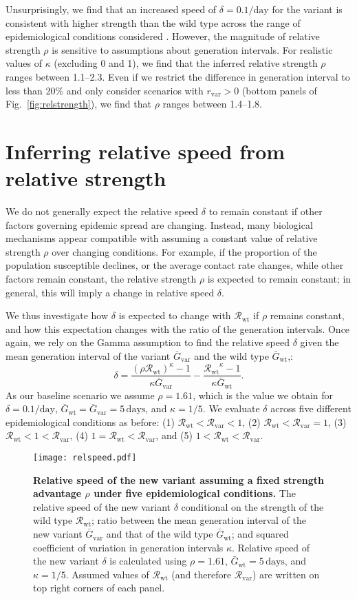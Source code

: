 \documentclass[12pt]{article}
\newcommand{\fref}[1]{Fig.~\ref{fig:#1}}
\newcommand{\vvvar}{\mathrm{var}}
\newcommand{\wwwt}{\mathrm{wt}}
\newcommand{\rx}[1]{\ensuremath{{r}_{#1}}\xspace}
\newcommand{\rv}{\rx{\vvvar}}
\newcommand{\Rx}[1]{\ensuremath{{\mathcal R}_{#1}}\xspace}
\newcommand{\Rw}{\Rx{\wwwt}}
\newcommand{\Rv}{\Rx{\vvvar}}
\newcommand{\days}{\ensuremath{\, \textrm{days}}}
\newcommand{\pday}{\ensuremath{/\textrm{day}}}
\newcommand{\Gx}[1]{\ensuremath{{\bar G}_{#1}}\xspace}
\newcommand{\Gw}{\Gx{\wwwt}}
\newcommand{\Gv}{\Gx{\vvvar}}
\begin{document}
Unsurprisingly, we find that an increased speed of $\delta=0.1\pday$ for the variant is consistent with higher strength than the wild type across the range of epidemiological conditions considered \citep{switzerland2021variant, davies2021estimated, di2021impact, leung2021early, volz2021transmission,zhao2021}.
However, the magnitude of relative strength $\rho$ is sensitive to assumptions about generation intervals.
For realistic values of $\kappa$ (excluding 0 and 1), we find that the inferred relative strength $\rho$ ranges between 1.1--2.3.
Even if we restrict the difference in generation interval to less than 20\% and only consider scenarios with $\rv>0$ (bottom panels of \fref{relstrength}), we find that $\rho$ ranges between 1.4--1.8.

\section{Inferring relative speed from relative strength}

We do not generally expect the relative speed $\delta$ to remain constant if other factors governing epidemic spread are changing.
Instead, many biological mechanisms appear compatible with assuming a constant value of relative strength $\rho$ over changing conditions.
For example, if the proportion of the population susceptible declines, or the average contact rate changes, while other factors remain constant, the relative strength $\rho$ is expected to remain constant; 
in general, this will imply a change in relative speed $\delta$.

We thus investigate how $\delta$ is expected to change with \Rw if $\rho$ remains constant, and how this expectation changes with the ratio of the generation intervals. 
Once again, we rely on the Gamma assumption to find the relative speed $\delta$ given the mean generation interval of the variant $\Gv$ and the wild type $\Gw$,:
\begin{equation}
\delta = \frac{(\rho \Rw)^{\kappa} - 1}{\kappa \Gv} - \frac{\Rw^{\kappa} - 1}{\kappa \Gw}.
\end{equation}
As our baseline scenario we assume $\rho = 1.61$, which is the value we obtain for $\delta=0.1\pday$, $\Gw = \Gv = 5\,\textrm{days}$, and $\kappa = 1/5$.
We evaluate $\delta$ across five different epidemiological conditions as before: (1) $\Rw < \Rv < 1$, (2) $\Rw < \Rv = 1$, (3) $\Rw < 1 < \Rv$, (4) $1 = \Rw < \Rv$, and (5) $1 < \Rw < \Rv$.

\begin{figure}[!th]
\texttt{[image: relspeed.pdf]}
\caption{
\textbf{Relative speed of the new variant assuming a fixed strength advantage $\rho$ under five epidemiological conditions.}
The relative speed of the new variant $\delta$ conditional on the strength of the wild type $\Rw$; ratio between the mean generation interval of the new variant $\Gv$ and that of the wild type $\Gw$; and squared coefficient of variation in generation intervals $\kappa$.
Relative speed of the new variant $\delta$ is calculated using $\rho=1.61$, $\Gw = 5\days$, and $\kappa = 1/5$.
Assumed values of $\Rw$ (and therefore $\Rv$) are written on top right corners of each panel.
}
\label{fig:relspeed}
\end{figure}
\end{document}
